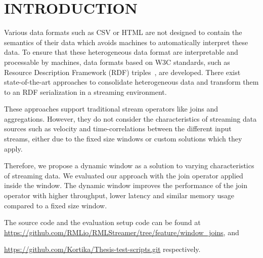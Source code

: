 \section{INTRODUCTION}
\label{chap:intro}

Various data formats such as CSV or HTML are not designed to contain the semantics of their data
which avoids machines to automatically interpret these data. 
To ensure that these heterogeneous data format are interpretable and 
processable by machines, data formats based on W3C standards, such as Resource Description 
Framework (RDF) triples~\cite{intro_rdf}, are developed. 
There exist state-of-the-art approaches to consolidate heterogeneous data
and transform them to an RDF serialization in a streaming environment. 

These approaches support traditional stream operators like joins and aggregations. 
However, they do not consider
the characteristics of streaming data sources such as velocity and 
time-correlations between the different
input streams, either due to the 
fixed size windows or custom solutions which they apply. 

Therefore, we propose a dynamic window as a solution to varying characteristics of streaming data. We evaluated our 
approach with the join operator applied inside the window. 
The dynamic window improves the performance of the 
join operator with higher throughput, lower latency and 
similar memory usage compared to a fixed size window.

The source code and the evaluation setup code can be found at
\url{https://github.com/RMLio/RMLStreamer/tree/feature/window_joins}, and 

\href{https://github.com/Kortika/Thesis-test-scripts.git}{https://github.com/Kortika/Thesis-test-scripts.git} respectively.
